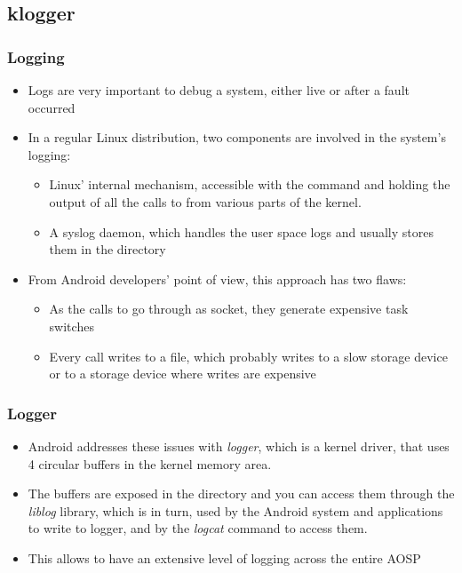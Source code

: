 \subsection{klogger}
\begin{frame}
  \frametitle{Logging}
  \begin{itemize}
  \item Logs are very important to debug a system, either live
    or after a fault occurred
  \item In a regular Linux distribution, two components are involved
    in the system's logging:
    \begin{itemize}
    \item Linux' internal mechanism, accessible with the 
      command and holding the output of all the calls to  from
      various parts of the kernel.
    \item A syslog daemon, which handles the user space logs and
      usually stores them in the  directory
    \end{itemize}
  \item From Android developers' point of view, this approach has two flaws:
    \begin{itemize}
    \item As the calls to  go through as socket, they generate
      expensive task switches
    \item Every call writes to a file, which probably writes to a
      slow storage device or to a storage device where writes are expensive
    \end{itemize}
  \end{itemize}
\end{frame}

\begin{frame}
  \frametitle{Logger}
  \begin{itemize}
  \item Android addresses these issues with \textit{logger}, which is
    a kernel driver, that uses 4 circular buffers in the kernel memory
    area.
  \item The buffers are exposed in the  directory and you can
    access them through the \textit{liblog} library, which is in turn, used by
    the Android system and applications to write to logger, and by
    the \textit{logcat} command to access them.
  \item This allows to have an extensive level of logging across the
    entire AOSP
  \end{itemize}
\end{frame}
